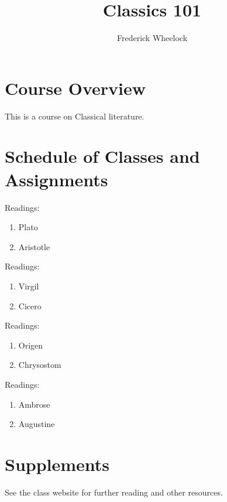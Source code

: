 \documentclass{article}
\newcounter{Unit}
\newcounter{Week}
\newcounter{Class}
\newenvironment{Readings}
	{Readings:\par\begin{enumerate}}
	{\end{enumerate}}
\begin{document}
\title{Classics 101}
\author{Frederick Wheelock}
\maketitle

\tableofcontents

\section{Course Overview}

This is a course on Classical literature.

\section{Schedule of Classes and Assignments}



\begin{Readings}
\item Plato
\item Aristotle
\end{Readings}


\begin{Readings}
\item Virgil
\item Cicero
\end{Readings}




\begin{Readings}
\item Origen
\item Chrysostom
\end{Readings}


\begin{Readings}
\item Ambrose
\item Augustine
\end{Readings}


\section{Supplements}

See the class website for further reading and other resources.
\end{document}
